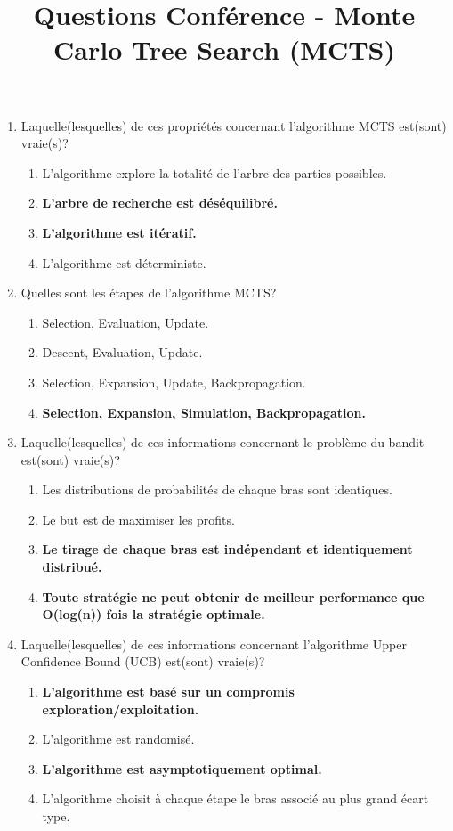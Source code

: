 \documentclass{article}
\newcommand{\itembf}{\item[\stepcounter{enumii}\textbf{\arabic{enumii}.}]}
\begin{document}
 

\title{Questions Conférence - Monte Carlo Tree Search (MCTS)}
\date{}
\maketitle
\begin{enumerate}
    \item Laquelle(lesquelles) de ces propriétés concernant l'algorithme MCTS est(sont) vraie(s)?
    \begin{enumerate}
        \item L'algorithme explore la totalité de l'arbre des parties possibles.
        \itembf \textbf{L'arbre de recherche est déséquilibré.}
        \itembf \textbf{L'algorithme est itératif.}
        \item L'algorithme est déterministe.
    \end{enumerate}
    \item Quelles sont les étapes de l'algorithme MCTS?
    \begin{enumerate}
        \item Selection, Evaluation, Update.
        \item Descent, Evaluation, Update.
        \item Selection, Expansion, Update, Backpropagation.
        \itembf \textbf{Selection, Expansion, Simulation, Backpropagation.}
    \end{enumerate}
    \item Laquelle(lesquelles) de ces informations concernant le problème du bandit est(sont) vraie(s)?
    \begin{enumerate}
        \item Les distributions de probabilités de chaque bras sont identiques.
        \item Le but est de maximiser les profits.
        \itembf \textbf{Le tirage de chaque bras est indépendant et identiquement distribué.}
        \itembf \textbf{Toute stratégie ne peut obtenir de meilleur performance que O(log(n)) fois la stratégie optimale.}
    \end{enumerate}
\item Laquelle(lesquelles) de ces informations concernant l'algorithme Upper Confidence Bound (UCB) est(sont) vraie(s)?
    \begin{enumerate}
        \itembf \textbf{L'algorithme est basé sur un compromis exploration/exploitation.}
        \item L'algorithme est randomisé.
        \itembf \textbf{L'algorithme est asymptotiquement optimal.}
        \item L'algorithme choisit à chaque étape le bras associé au plus grand écart type.
    \end{enumerate}
\end{enumerate}
\end{document}

